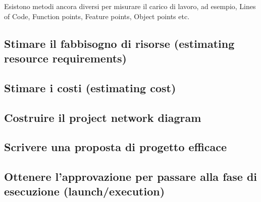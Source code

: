 \noindent Esistono metodi ancora diversi per misurare il carico di lavoro, ad esempio, Lines of Code, Function points, Feature points, Object points etc.

\subsection{Stimare il fabbisogno di risorse (estimating resource requirements)}
\subsection{Stimare i costi (estimating cost)}
\subsection{Costruire il project network diagram}
\subsection{Scrivere una proposta di progetto efficace}
\subsection{Ottenere l’approvazione per passare alla fase di esecuzione (launch/execution)}

\newpage